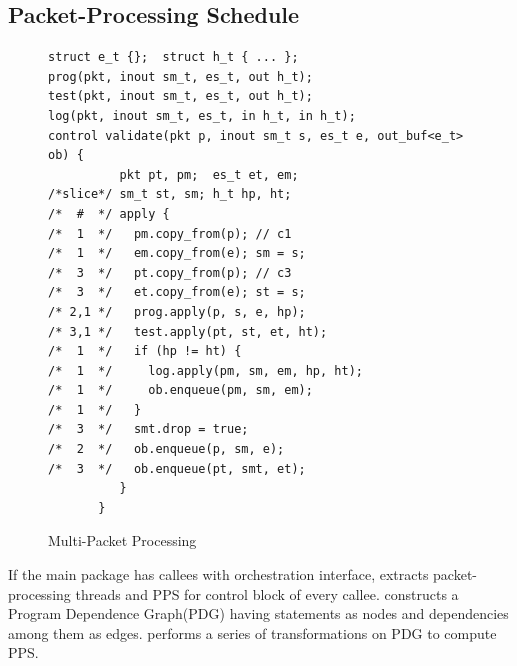 \documentclass[letterpaper,twocolumn,10pt]{article}
\begin{document}
\subsection{Packet-Processing Schedule}
\label{subsubsection:packet-processing-schedule}


\begin{figure}[!h]
\begin{lstlisting}[frame=none]
struct e_t {};  struct h_t { ... };
prog(pkt, inout sm_t, es_t, out h_t);
test(pkt, inout sm_t, es_t, out h_t);
log(pkt, inout sm_t, es_t, in h_t, in h_t);
control validate(pkt p, inout sm_t s, es_t e, out_buf<e_t> ob) {
          pkt pt, pm;  es_t et, em;  
/*slice*/ sm_t st, sm; h_t hp, ht;
/*  #  */ apply {
/*  1  */   pm.copy_from(p); // c1
/*  1  */   em.copy_from(e); sm = s;
/*  3  */   pt.copy_from(p); // c3 
/*  3  */   et.copy_from(e); st = s;
/* 2,1 */   prog.apply(p, s, e, hp); 
/* 3,1 */   test.apply(pt, st, et, ht); 
/*  1  */   if (hp != ht) {
/*  1  */     log.apply(pm, sm, em, hp, ht);
/*  1  */     ob.enqueue(pm, sm, em);
/*  1  */   }
/*  3  */   smt.drop = true;
/*  2  */   ob.enqueue(p, sm, e);
/*  3  */   ob.enqueue(pt, smt, et);
          }
       }
\end{lstlisting}
\caption{Multi-Packet Processing}
\label{fig:multi-packet-processing}
\end{figure}
If the main package has callees with orchestration interface, \ucomp 
extracts packet-processing threads and PPS for control block of every 
callee.
\ucomp constructs a Program Dependence Graph(PDG) 
\cite{Ferrante:1987:PDG:24039.24041} having statements as nodes and 
dependencies among them as edges. 
\ucomp  performs a series of transformations on PDG to compute PPS.
\end{document}

